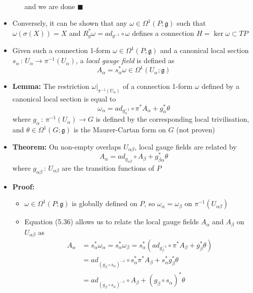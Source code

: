 \documentclass[12pt,a4paper]{article}
\numberwithin{equation}{section}
\begin{document}
\begin{itemize}
\begin{itemize}
$$\begin{aligned}
			\end{aligned}
			$$
			and we are done $\blacksquare$
		\end{itemize}
		\item Conversely, it can be shown that any $\omega\in\Omega^{1}(P;\mathfrak{g})$ such that $\omega(\sigma(X))=X$ and $R^{*}_{g}\omega=ad_{g^{-1}}\circ\omega$ defines a connection $H=\ker{\omega}\subset TP$
		\item Given such a connection 1-form $\omega\in\Omega^{1}(P;\mathfrak{g})$ and a canonical local section $s_{\alpha}\,:\,U_{\alpha}\to\pi^{-1}(U_{\alpha})$, a \textit{local gauge field} is defined as
		\begin{equation}
			A_{\alpha}=s_{\alpha}^{*}\omega\in\Omega^{1}(U_{\alpha};\mathfrak{g})
		\end{equation}
		\item \textbf{Lemma:} The restriction $\omega\rvert_{\pi^{-1}(U_{\alpha})}$ of a connection 1-form $\omega$ defined by a canonical local section is equal to
		\begin{equation}
			\omega_{\alpha}=ad_{g_{\alpha}^{-1}}\circ\pi^{*}A_{\alpha}+g^{*}_{\alpha}\theta
		\end{equation}
		where $g_{\alpha}\,:\,\pi^{-1}(U_{\alpha})\to G$ is defined by the corresponding local trivilisation, and $\theta\in\Omega^{1}(G;\mathfrak{g})$ is the Maurer-Cartan form on $G$ (not proven)
		\item \textbf{Theorem:} On non-empty overlaps $U_{\alpha\beta}$, local gauge fields are related by
		\begin{equation}
			A_{\alpha}=ad_{g_{\alpha\beta}}\circ A_{\beta}+g^{*}_{\beta\alpha}\theta
		\end{equation}
		where $g_{\alpha\beta}\,:\,U_{\alpha\beta}$ are the transition functions of $P$
		\item \textbf{Proof:}
		\begin{itemize}
			\item $\omega\in\Omega^{1}(P;\mathfrak{g})$ is globally defined on $P$, so $\omega_{\alpha}=\omega_{\beta}$ on $\pi^{-1}(U_{\alpha\beta})$
			\item Equation (5.36) allows us to relate the local gauge fields $A_{\alpha}$ and $A_{\beta}$ on $U_{\alpha\beta}$ as
			$$
			\begin{aligned}
				A_{\alpha}&=s_{\alpha}^{*}\omega_{\alpha} =s_{\alpha}^{*}\omega_{\beta}=s_{\alpha}^{*}(ad_{g_{\beta}^{-1}}\circ\pi^{*}A_{\beta}+g_{\beta}^{*}\theta)\\&=ad_{(g_{\beta}\circ s_{\alpha})^{-1}}\circ s_{\alpha}^{*}\pi^{*}A_{\beta}+s_{\alpha}^{*}g_{\beta}^{*}\theta\\&=ad_{(g_{\beta}\circ s_{\alpha})^{-1}}\circ A_{\beta}+(g_{\beta}\circ s_{\alpha})^{*}\theta

\end{aligned}$$
\end{itemize}
\end{itemize}
\end{document}
